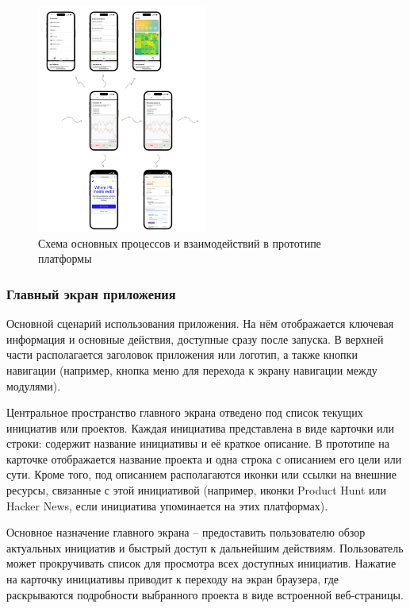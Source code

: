 \documentclass[
    candidate, %
    subf, %
    dotsinheaders=false,
]{disser}
\begin{document}
\begin{figure}[h]
  \centering
  \includegraphics[width=0.5\textwidth]{./assets/app-prototype.png}
  \caption{Схема основных процессов и взаимодействий в прототипе платформы}
  \label{fig:app-prototype}
\end{figure}

\subsubsection{Главный экран приложения}

Основной сценарий использования приложения. На нём отображается ключевая информация и основные действия, доступные сразу после запуска. В верхней части располагается заголовок приложения или логотип, а также кнопки навигации (например, кнопка меню для перехода к экрану навигации между модулями).

Центральное пространство главного экрана отведено под список текущих инициатив или проектов. Каждая инициатива представлена в виде карточки или строки: содержит название инициативы и её краткое описание. В прототипе на карточке отображается название проекта и одна строка с описанием его цели или сути. Кроме того, под описанием располагаются иконки или ссылки на внешние ресурсы, связанные с этой инициативой (например, иконки Product Hunt или Hacker News, если инициатива упоминается на этих платформах).

Основное назначение главного экрана – предоставить пользователю обзор актуальных инициатив и быстрый доступ к дальнейшим действиям. Пользователь может прокручивать список для просмотра всех доступных инициатив. Нажатие на карточку инициативы приводит к переходу на экран браузера, где раскрываются подробности выбранного проекта в виде встроенной веб-страницы.
\end{document}
